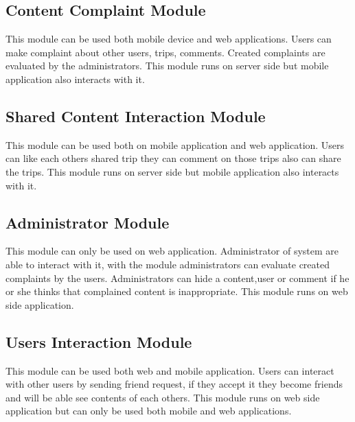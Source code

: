 \subsection{Content Complaint Module}   
This module can be used both mobile device and web applications. Users can make complaint about other users, trips, comments. Created complaints are evaluated by the administrators. This module runs on server side but mobile application also interacts with it.
    
\subsection{Shared Content Interaction Module}    
This module can be used both on mobile application and web application. Users can like each others shared trip they can comment on those trips also can share the trips. This module runs on server side but mobile application also interacts with it.

\subsection{Administrator Module}
This module can only be used on web application. Administrator of system are able to interact with it, with the module administrators can evaluate created complaints by the users. Administrators can hide a content,user or comment if he or she thinks that complained content is inappropriate. This module runs on web side application.

\subsection{Users Interaction Module}
This module can be used both web and mobile application. Users can interact with other users by sending friend request, if they accept it they become friends and will be able see contents of each others. This module runs on web side application but can only be used both mobile and web applications.

    
\newpage 
